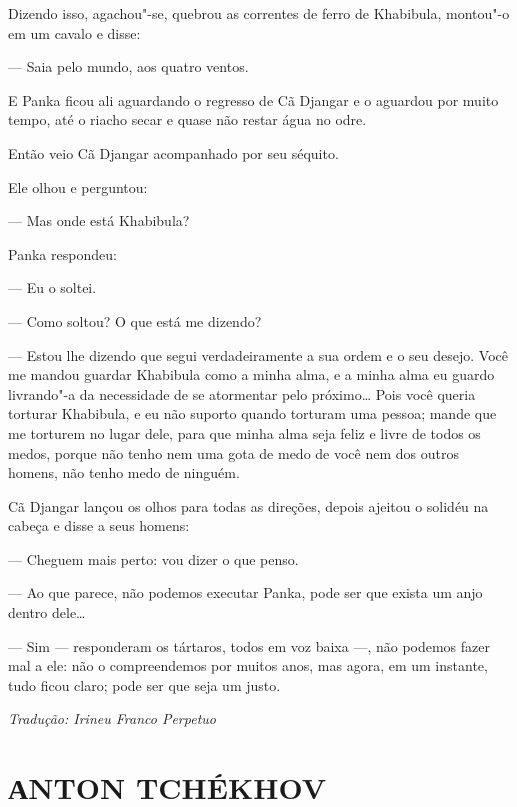 Dizendo isso, agachou"-se, quebrou as correntes de ferro de Khabibula,
montou"-o em um cavalo e disse:

--- Saia pelo mundo, aos quatro ventos.

E Panka ficou ali aguardando o regresso de Cã Djangar e o aguardou por
muito tempo, até o riacho secar e quase não restar água no odre.

Então veio Cã Djangar acompanhado por seu séquito.

Ele olhou e perguntou:

--- Mas onde está Khabibula?

Panka respondeu:

--- Eu o soltei.

--- Como soltou? O que está me dizendo?

--- Estou lhe dizendo que segui verdadeiramente a sua ordem e o seu
desejo. Você me mandou guardar Khabibula como a minha alma, e a minha
alma eu guardo livrando"-a da necessidade de se atormentar pelo
próximo\ldots{} Pois você queria torturar Khabibula, e eu não suporto quando
torturam uma pessoa; mande que me torturem no lugar dele, para
que minha alma seja feliz e livre de todos os medos, porque não tenho
nem uma gota de medo de você nem dos outros homens, não tenho medo de
ninguém.

Cã Djangar lançou os olhos para todas as direções, depois ajeitou
o solidéu na cabeça e disse a seus homens:

--- Cheguem mais perto: vou dizer o que penso.


--- Ao que parece, não podemos executar Panka, pode ser que exista um
anjo dentro dele\ldots{}

--- Sim --- responderam os tártaros, todos em voz baixa ---, não podemos
fazer mal a ele: não o compreendemos por muitos anos, mas agora, em um
instante, tudo ficou claro; pode ser que seja um justo.

\medskip

{\footnotesize\hfill\emph{Tradução: Irineu Franco Perpetuo}}




\part[АNTON TCHÉKHOV]{АNTON TCHÉKHOV }

